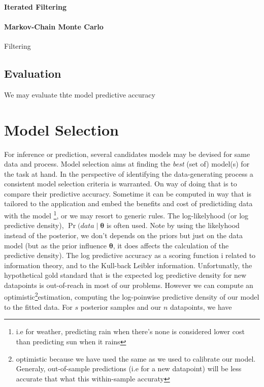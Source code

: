 \paragraph{Iterated Filtering}


\paragraph{Markov-Chain Monte Carlo}




 Filtering
\subsection{Evaluation}
We may evaluate thte model predictive accuracy
\section{Model Selection}
For inference or prediction, several candidates models may be devised for same data and process. Model selection aims at finding the \textit{best} (set of) model(s) for the task at hand. In the perspective of identifying the data-generating process a consistent model selection criteria is warranted\parencite{Hoge:PrimerModelSelection:2018}.  On way of doing that is to compare their predictive accuracy. Sometime it can be computed in way that is tailored to the application and embed the benefits and cost of predictiding data with the model \footnote{i.e for weather, predicting rain when there’s none is considered lower cost than predicting sun when it rains}, or we may resort to generic rules.
The log-likelyhood (or log predictive density), $\Pr(data \mid \boldsymbol\theta$  is often used. Note by using the likelyhood instead of the posterior, we don’t depends on the priors but just on the data model (but as the prior influence $\boldsymbol\theta$, it does affects the calculation of the predictive density). The log predictive accuracy as a scoring function i related to information theory, and to the Kull-back Leibler information.
Unfortunatly, the hypothetical gold standard that is the expected log predictive density for new datapoints is out-of-reach in most of our problems. However we can compute an optimistic\footnote{optimistic because we have used the same as we used to calibrate our model. Generaly, out-of-sample predictions (i.e for a new datapoint) will be less accurate that what this within-sample accuraty}estimation, computing the log-poinwise predictive density of our model to the fitted data. For $s$ posterior samples and our $n$ datapoints, we have
